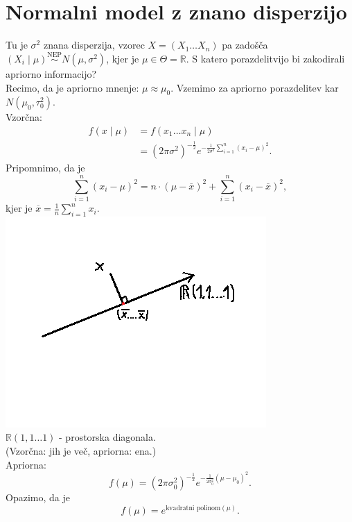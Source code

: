 \documentclass[a4paper, 12pt]{book}
\theoremstyle{definition}
\theoremstyle{remark}
\newcommand{\R}{\mathbb{R}}
\begin{document}
\section{Normalni model z znano disperzijo}

Tu je $\sigma^2$ znana disperzija, vzorec $X = (X_1 \dots X_n)$ pa zadošča \\
$(X_i \mid \mu) \stackrel{\text{NEP}}{\sim} N(\mu, \sigma^2)$, kjer je $\mu \in \Theta = \R$.
S katero porazdelitvijo bi zakodirali apriorno informacijo? \\
Recimo, da je apriorno mnenje: $\mu \approx \mu_0$.
Vzemimo za apriorno porazdelitev kar $N(\mu_0, \tau_0^2)$. \\
Vzorčna:
\begin{align*}
  f(x \mid \mu) &= f(x_1 \dots x_n \mid \mu) \\
  &= (2 \pi \sigma^2)^{-\frac{1}{2}} e^{-\frac{1}{2 \sigma^2} \sum_{i=1}^{n} (x_i - \mu)^2}.
\end{align*}
Pripomnimo, da je
\begin{equation*}
  \sum_{i=1}^{n} (x_i - \mu)^2 = n \cdot (\mu - \overline{x})^2 + \sum_{i=1}^{n} (x_i - \overline{x})^2,
\end{equation*}
kjer je $\overline{x} = \frac{1}{n} \sum_{i=1}^{n} x_i$. \\
\includegraphics[scale=0.5]{x_prostorska_2_2} \\
$\R(1,1 \dots 1)$ - prostorska diagonala. \\
(Vzorčna: jih je več, apriorna: ena.) \\
Apriorna:
\begin{equation*}
  f(\mu) = (2 \pi \sigma_0^2)^{-\frac{1}{2}} e^{-\frac{1}{2 \sigma_0^2} (\mu - \mu_0)^2}.
\end{equation*}
Opazimo, da je
\begin{equation*}
  f(\mu) = e^{\text{kvadratni polinom}(\mu)}.
\end{equation*}
\end{document}
